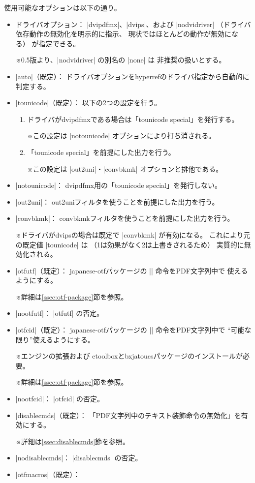\documentclass[uplatex,dvipdfmx,a4paper]{jsarticle}
\newcommand{\Pkg}[1]{\textsf{#1}}
\newcommand{\Note}{\par\noindent ※}
\newcommand{\Means}{：\quad}
\providecommand{\Strong}[1]{\textsf{#1}}
\begin{document}
使用可能なオプションは以下の通り。
\begin{itemize}
\item \Strong{ドライバオプション}\Means
  |dvipdfmx|、|dvips|、および |nodvidriver|%
  （ドライバ依存動作の無効化を明示的に指示、
  現状ではほとんどの動作が無効になる）
  が指定できる。
  \Note 0.5版より、|nodvidriver| の別名の |none| は
    \Strong{非推奨}の扱いとする。
\item |auto|（既定）\Means
  ドライバオプションを\Pkg{hyperref}のドライバ指定から自動的に判定する。
\item |tounicode|（既定）\Means
  以下の2つの設定を行う。
  \begin{enumerate}
  \item ドライバがdvipdfmxである場合は「tounicode special」を発行する。
    \Note この設定は |notounicode| オプションにより打ち消される。
  \item 「tounicode special」を前提にした出力を行う。
    \Note この設定は |out2uni|・|convbkmk| オプションと排他である。
  \end{enumerate}
\item |notounicode|\Means
  dvipdfmx用の「tounicode special」を発行しない。
\item |out2uni|\Means
  out2uniフィルタを使うことを前提にした出力を行う。
\item |convbkmk|\Means
  convbkmkフィルタを使うことを前提にした出力を行う。
  \Note ドライバがdvipsの場合は既定で |convbkmk| が有効になる。
  これにより元の既定値 |tounicode| は
  （1は効果がなく2は上書きされるため）
  実質的に無効化される。
\item |otfutf|（既定）\Means
  \Pkg{japanese-otf}パッケージの |\UTF| 命令をPDF文字列中で
  使えるようにする。
  \Note 詳細は\ref{ssec:otf-package}節を参照。
\item |nootfutf|\Means
  |otfutf| の否定。
\item |otfcid|（既定）\Means
  \Pkg{japanese-otf}パッケージの |\CID| 命令をPDF文字列中で
  “可能な限り”使えるようにする。
  \Note エンジンの{\eTeX}拡張および
  \Pkg{etoolbox}と\Pkg{bxjatoucs}パッケージのインストールが必要。
  \Note 詳細は\ref{ssec:otf-package}節を参照。
\item |nootfcid|\Means
  |otfcid| の否定。
\item |disablecmds|（既定）\Means
  「PDF文字列中のテキスト装飾命令の無効化」を有効にする。
  \Note 詳細は\ref{ssec:disablecmds}節を参照。
\item |nodisablecmds|\Means
  |disablecmds| の否定。
\item |otfmacros|（既定）\Means

\end{itemize}
\end{document}
